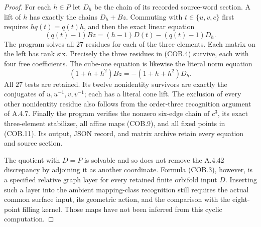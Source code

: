\begin{proof}
For each $h\in P$ let $D_h$ be the chain of its
recorded source-word section. A lift of $h$ has
exactly the chains $D_h+Bz$. Commuting with
$t\in\{u,v,c\}$ first requires $h q(t)=q(t)h$,
and then the exact linear equation
\[
 (q(t)-1)Bz=(h-1)D(t)-(q(t)-1)D_h.
                                                               \tag{COB.14}
\]
The program solves all $27$ residues for each of
the three elements. Each matrix on the left has
rank six. Precisely the three residues in (COB.4)
survive, each with four free coefficients.
The cube-one equation is likewise the literal
norm equation
\[
 (1+h+h^2)Bz=-(1+h+h^2)D_h.
                                                               \tag{COB.15}
\]
All $27$ tests are retained. Its twelve nonidentity
survivors are exactly the conjugates of
$u,u^{-1},v,v^{-1}$; each has a literal cone lift.
The exclusion of every other nonidentity residue
also follows from the order-three recognition
argument of A.4.7. Finally the program verifies
the nonzero six-edge chain of $c^3$, its exact
three-element stabilizer, all affine maps (COB.9),
and all fixed points in (COB.11).
Its output, JSON record, and matrix archive retain
every equation and source section.

The quotient with $D=P$ is solvable and so does
not remove the A.4.42 discrepancy by adjoining it
as another coordinate. Formula (COB.3), however,
is a specified relative graph layer for every
retained finite orbifold input $D$. Inserting such
a layer into the ambient mapping-class recognition
still requires the actual common surface input,
its geometric action, and the comparison with the
eight-point filling kernel. Those maps have not
been inferred from this cyclic computation.
\end{proof}
